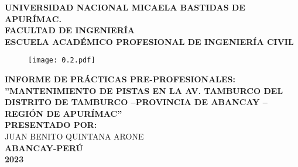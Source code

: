
\begin{titlepage}
	\begin{center}
		\textsf{\textbf{\LARGE UNIVERSIDAD NACIONAL MICAELA BASTIDAS DE APURÍMAC.}}\\
		\vspace{5mm}
		\textsf{\textbf{\Large FACULTAD DE INGENIERÍA}}\\
		\vspace{5mm}
		\textsf{\textbf{ \Large ESCUELA ACADÉMICO PROFESIONAL DE INGENIERÍA CIVIL}}\\
		\vspace{5mm}	
		\begin{figure}[h!]
			\centering
			\texttt{[image: 0.2.pdf]}
		\end{figure}
		
		\vspace{3mm}	
		\textsf{\textbf{ \Large INFORME DE PRÁCTICAS PRE-PROFESIONALES:}}\\
		\vspace{7mm} {\Large \textbf{''MANTENIMIENTO DE PISTAS EN LA AV. TAMBURCO DEL DISTRITO DE TAMBURCO –PROVINCIA DE ABANCAY – REGIÓN DE APURÍMAC''}}\\
		
		\vspace{5mm}
		\textsf{\textbf{ \Large PRESENTADO POR:}}\\
		\vspace{5mm}
		{\Large\textsf{JUAN BENITO QUINTANA ARONE}}\\
		
		
	
		\vfill
		\textsf{\textbf{ \Large ABANCAY-PERÚ}}\\
		\vspace{5mm}
		\textsf{\textbf{ \LARGE 2023}}\\
		\end{center}
\end{titlepage}

